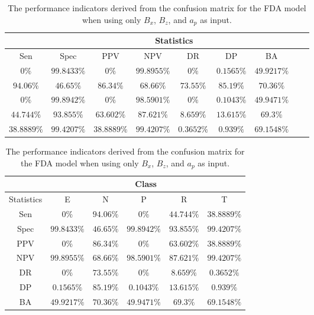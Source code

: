 \begin{table}[!ht]
	\centering
	\begin{tabular}{|c|c|c|c|c|c|c|c|c|}
		\hline
		 & \multicolumn{7}{c|}{Statistics} \\ \hline
		Sen & Spec & PPV & NPV & DR & DP & BA \\ \hline
		$0\%$ & $99.8433\%$ & $0\%$ & $99.8955\%$ & $0\%$ & $0.1565\%$ & $49.9217\%$ \\ \hline
		$94.06\%$ & $46.65\%$ & $86.34\%$ & $68.66\%$ & $73.55\%$ & $85.19\%$ & $70.36\%$ \\ \hline
		$0\%$ & $99.8942\%$ & $0\%$ & $98.5901\%$ & $0\%$ & $0.1043\%$ & $49.9471\%$ \\ \hline
		$44.744\%$ & $93.855\%$ & $63.602\%$ & $87.621\%$ & $8.659\%$ & $13.615\%$ & $69.3\%$ \\ \hline
		$38.8889\%$ & $99.4207\%$ & $38.8889\%$ & $99.4207\%$ & $0.3652\%$ & $0.939\%$ & $69.1548\%$ \\ \hline
	\end{tabular}
	\caption{The performance indicators derived from the confusion matrix for the FDA model when using only $B_{x}$, $B_{z}$, and $a_{p}$ as input.}
	\label{tab:cs:xzap:fda}
\end{table}

\begin{table}[!ht]
	\centering
	\begin{tabular}{|c|c|c|c|c|c|}
		\hline
		 & \multicolumn{5}{c|}{Class} \\ \hline
		Statistics & E & N & P & R & T \\ \hline
		Sen & $0\%$ & $94.06\%$ & $0\%$ & $44.744\%$ & $38.8889\%$ \\ \hline
		Spec & $99.8433\%$ & $46.65\%$ & $99.8942\%$ & $93.855\%$ & $99.4207\%$ \\ \hline
		PPV & $0\%$ & $86.34\%$ & $0\%$ & $63.602\%$ & $38.8889\%$ \\ \hline
		NPV & $99.8955\%$ & $68.66\%$ & $98.5901\%$ & $87.621\%$ & $99.4207\%$ \\ \hline
		DR & $0\%$ & $73.55\%$ & $0\%$ & $8.659\%$ & $0.3652\%$ \\ \hline
		DP & $0.1565\%$ & $85.19\%$ & $0.1043\%$ & $13.615\%$ & $0.939\%$ \\ \hline
		BA & $49.9217\%$ & $70.36\%$ & $49.9471\%$ & $69.3\%$ & $69.1548\%$ \\ \hline
	\end{tabular}
	\caption{The performance indicators derived from the confusion matrix for the FDA model when using only $B_{x}$, $B_{z}$, and $a_{p}$ as input.}
	\label{tab:cs:reverse:xzap:fda}
\end{table}

